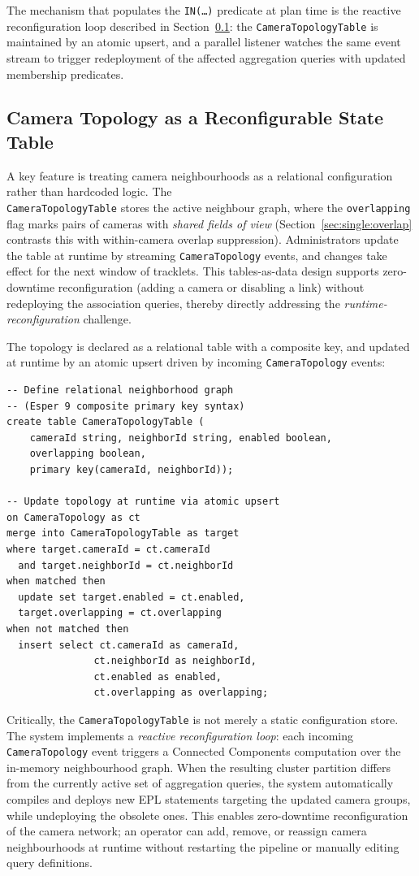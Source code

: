\documentclass[5p,times]{elsarticle}
\begin{document}
The mechanism that populates the \texttt{IN(\dots)} predicate at plan time is the reactive reconfiguration loop described in Section~\ref{sec:multi:topology}: the \texttt{CameraTopologyTable} is maintained by an atomic upsert, and a parallel listener watches the same event stream to trigger redeployment of the affected aggregation queries with updated membership predicates.



\subsection{Camera Topology as a Reconfigurable State Table}
\label{sec:multi:topology}
A key feature is treating camera neighbourhoods as a relational configuration rather than hardcoded logic. The\\ \texttt{CameraTopologyTable} stores the active neighbour graph, where the \texttt{overlapping} flag marks pairs of cameras with \emph{shared fields of view} (Section~\ref{sec:single:overlap} contrasts this with within-camera overlap suppression). Administrators update the table at runtime by streaming \texttt{CameraTopology} events, and changes take effect for the next window of tracklets. This tables-as-data design supports zero-downtime reconfiguration (adding a camera or disabling a link) without redeploying the association queries, thereby directly addressing the \emph{runtime-reconfiguration} challenge.

The topology is declared as a relational table with a composite key, and updated at runtime by an atomic upsert driven by incoming \texttt{CameraTopology} events:
{\small
\begin{verbatim}
-- Define relational neighborhood graph
-- (Esper 9 composite primary key syntax)
create table CameraTopologyTable (
    cameraId string, neighborId string, enabled boolean, 
    overlapping boolean,
    primary key(cameraId, neighborId));

-- Update topology at runtime via atomic upsert 
on CameraTopology as ct
merge into CameraTopologyTable as target
where target.cameraId = ct.cameraId
  and target.neighborId = ct.neighborId
when matched then
  update set target.enabled = ct.enabled, 
  target.overlapping = ct.overlapping
when not matched then
  insert select ct.cameraId as cameraId,
               ct.neighborId as neighborId,
               ct.enabled as enabled,
               ct.overlapping as overlapping;
\end{verbatim}
}
Critically, the \texttt{CameraTopologyTable} is not merely a static configuration store. The system implements a \emph{reactive reconfiguration loop}: each incoming \texttt{CameraTopology} event triggers a Connected Components computation over the in-memory neighbourhood graph. When the resulting cluster partition differs from the currently active set of aggregation queries, the system automatically compiles and deploys new EPL statements targeting the updated camera groups, while undeploying the obsolete ones. This enables zero-downtime reconfiguration of the camera network; an operator can add, remove, or reassign camera neighbourhoods at runtime without restarting the pipeline or manually editing query definitions.
\end{document}

